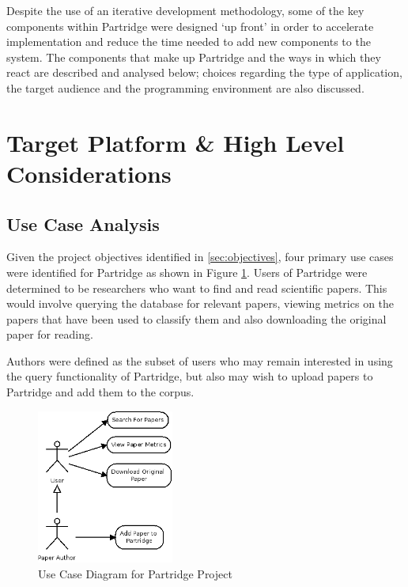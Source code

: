 %
%

Despite the use of an iterative development methodology, some of the key
components within Partridge were designed `up front' in order to accelerate
implementation and reduce the time needed to add new components to the
system. The components that make up Partridge and the ways in which they react
are described and analysed below; choices regarding the type of application,
the target audience and the programming environment are also discussed.


\section{ Target Platform \& High Level Considerations }

\subsection{Use Case Analysis}

Given the project objectives identified in \ref{sec:objectives}, four primary
use cases were identified for Partridge as shown in Figure \ref{fig:use_cases}.
Users of Partridge were determined to be researchers who want to find and read
scientific papers. This would involve querying the database for relevant
papers, viewing metrics on the papers that have been used to classify them and
also downloading the original paper for reading. 

Authors were defined as the subset of users who may remain interested in using
the query functionality of Partridge, but also may wish to upload papers to
Partridge and add them to the corpus.

\begin{figure}[!h]
\centering
\includegraphics[width=0.4\textwidth]{images/design/use_cases.png}
\caption{Use Case Diagram for Partridge Project}
\label{fig:use_cases}
\end{figure}

